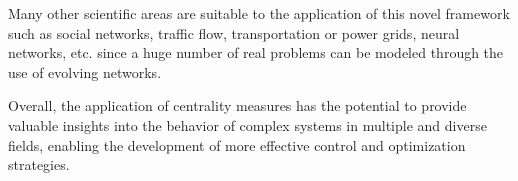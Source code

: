 Many other scientific areas are suitable to the application of this novel framework such as social networks, traffic flow, transportation or power grids, neural networks, etc. since a huge number of real problems can be modeled through the use of evolving networks.

Overall, the application of centrality measures has the potential to provide valuable insights into the behavior of complex systems in multiple and diverse fields, enabling the development of more effective control and optimization strategies.